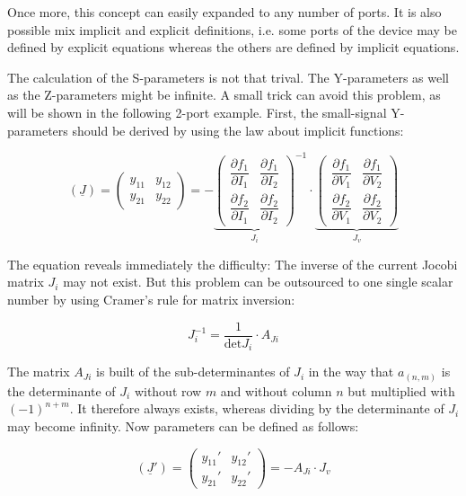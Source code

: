 Once more, this concept can easily expanded to any number of ports.
It is also possible mix implicit and explicit definitions, i.e. some
ports of the device may be defined by explicit equations whereas the
others are defined by implicit equations.

\addvspace{12pt}

The calculation of the S-parameters is not that trival. The Y-parameters as well
as the Z-parameters might be infinite. A small trick can avoid this problem, as
will be shown in the following 2-port example. First, the small-signal
Y-parameters should be derived by using the law about implicit functions:

\begin{equation}
(\underline{J}) =
\begin{pmatrix}
y_{11} & y_{12}\\
y_{21} & y_{22}
\end{pmatrix}
=
-{\underbrace{
\begin{pmatrix}
\dfrac{\partial f_1}{\partial I_1} & \dfrac{\partial f_1}{\partial I_2}\\
\dfrac{\partial f_2}{\partial I_1} & \dfrac{\partial f_2}{\partial I_2}
\end{pmatrix}}_{J_i}}^{-1}\cdot
\underbrace{
\begin{pmatrix}
\dfrac{\partial f_1}{\partial V_1} & \dfrac{\partial f_1}{\partial V_2}\\
\dfrac{\partial f_2}{\partial V_1} & \dfrac{\partial f_2}{\partial V_2}
\end{pmatrix}}_{J_v}
\end{equation}

The equation reveals immediately the difficulty: The inverse of the current
Jocobi matrix $J_i$ may not exist. But this problem can be outsourced to
one single scalar number by using Cramer's rule for matrix inversion:

\begin{equation}
J_i^{-1} = \dfrac{1}{\text{det} J_i}\cdot A_{Ji}
\end{equation}

The matrix $A_{Ji}$ is built of the sub-determinantes of $J_i$ in the way that
$a_{(n,m)}$ is the determinante of $J_i$ without row $m$ and without column $n$
but multiplied with $(-1)^{n+m}$. It therefore always exists, whereas dividing
by the determinante of $J_i$ may become infinity. Now parameters can be
defined as follows:

\begin{equation}
(\underline{J}') =
\begin{pmatrix}
y_{11}' & y_{12}'\\
y_{21}' & y_{22}'
\end{pmatrix}
=
-A_{Ji}\cdot J_v
\end{equation}

